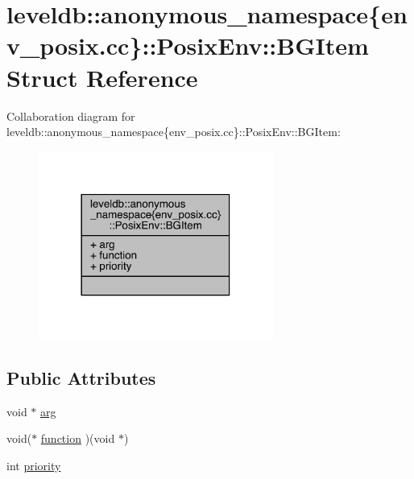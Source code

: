 \hypertarget{structleveldb_1_1anonymous__namespace_02env__posix_8cc_03_1_1_posix_env_1_1_b_g_item}{}\section{leveldb\+:\+:anonymous\+\_\+namespace\{env\+\_\+posix.\+cc\}\+:\+:Posix\+Env\+:\+:B\+G\+Item Struct Reference}
\label{structleveldb_1_1anonymous__namespace_02env__posix_8cc_03_1_1_posix_env_1_1_b_g_item}


Collaboration diagram for leveldb\+:\+:anonymous\+\_\+namespace\{env\+\_\+posix.\+cc\}\+:\+:Posix\+Env\+:\+:B\+G\+Item\+:
\nopagebreak
\begin{figure}[H]
\begin{center}
\leavevmode
\includegraphics[width=218pt]{structleveldb_1_1anonymous__namespace_02env__posix_8cc_03_1_1_posix_env_1_1_b_g_item__coll__graph}
\end{center}
\end{figure}
\subsection*{Public Attributes}
\begin{DoxyCompactItemize}
\item 
void $\ast$ \hyperlink{structleveldb_1_1anonymous__namespace_02env__posix_8cc_03_1_1_posix_env_1_1_b_g_item_a74e25eb616951d62f30be1bdcf609315}{arg}
\item 
void($\ast$ \hyperlink{structleveldb_1_1anonymous__namespace_02env__posix_8cc_03_1_1_posix_env_1_1_b_g_item_a3106f421219be6938348cd6ae36ad776}{function} )(void $\ast$)
\item 
int \hyperlink{structleveldb_1_1anonymous__namespace_02env__posix_8cc_03_1_1_posix_env_1_1_b_g_item_a51d44936b20bcb7acfe5b51da9570f32}{priority}
\end{DoxyCompactItemize}


